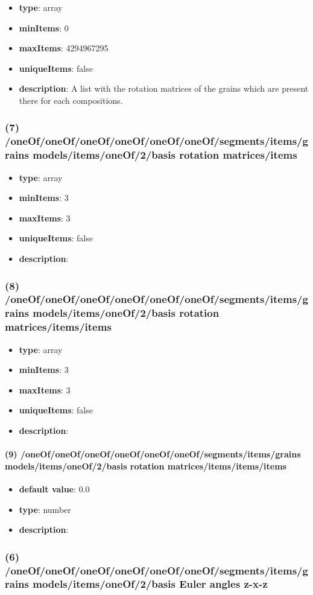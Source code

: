 \begin{itemize}[leftmargin=6em]\item {\bf type}: array
\item {\bf minItems}: 0
\item {\bf maxItems}: 4294967295
\item {\bf uniqueItems}: false
\item {\bf description}: A list with the rotation matrices of the grains which are present there for each compositions.
\end{itemize}\subsubsection{(7) /oneOf/oneOf/oneOf/oneOf/oneOf/oneOf/segments/items/grains models/items/oneOf/2/basis rotation matrices/items}
\begin{itemize}[leftmargin=7em]\item {\bf type}: array
\item {\bf minItems}: 3
\item {\bf maxItems}: 3
\item {\bf uniqueItems}: false
\item {\bf description}: 
\end{itemize}\subsubsection{(8) /oneOf/oneOf/oneOf/oneOf/oneOf/oneOf/segments/items/grains models/items/oneOf/2/basis rotation matrices/items/items}
\begin{itemize}[leftmargin=8em]\item {\bf type}: array
\item {\bf minItems}: 3
\item {\bf maxItems}: 3
\item {\bf uniqueItems}: false
\item {\bf description}: 
\end{itemize}\paragraph{(9) /oneOf/oneOf/oneOf/oneOf/oneOf/oneOf/segments/items/grains models/items/oneOf/2/basis rotation matrices/items/items/items}
\begin{itemize}[leftmargin=9em]\item {\bf default value}: 0.0
\item {\bf type}: number
\item {\bf description}: 
\end{itemize}\subsubsection{(6) /oneOf/oneOf/oneOf/oneOf/oneOf/oneOf/segments/items/grains models/items/oneOf/2/basis Euler angles z-x-z}
